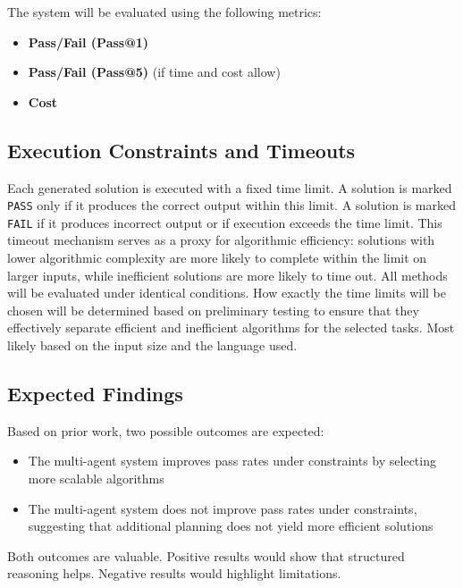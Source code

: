 \documentclass{article}
\begin{document}
The system will be evaluated using the following metrics:

\begin{itemize}[noitemsep]
    \item \textbf{Pass/Fail (Pass@1)}
    \item \textbf{Pass/Fail (Pass@5)} (if time and cost allow)
    \item \textbf{Cost}
\end{itemize}

\subsection*{Execution Constraints and Timeouts}

Each generated solution is executed with a fixed time limit. A solution is marked \texttt{PASS} only if it produces the correct output within this limit. A solution is marked \texttt{FAIL} if it produces incorrect output or if execution exceeds the time limit. This timeout mechanism serves as a proxy for algorithmic efficiency: solutions with lower algorithmic complexity are more likely to complete within the limit on larger inputs, while inefficient solutions are more likely to time out. All methods will be evaluated under identical conditions.
How exactly the time limits will be chosen will be determined based on preliminary testing to ensure that they effectively separate efficient and inefficient algorithms for the selected tasks. Most likely based on the input size and the language used.

\subsection*{Expected Findings}

Based on prior work, two possible outcomes are expected:

\begin{itemize}[noitemsep]
    \item The multi-agent system improves pass rates under constraints by selecting more scalable algorithms
    \item The multi-agent system does not improve pass rates under constraints, suggesting that additional planning does not yield more efficient solutions
\end{itemize}

Both outcomes are valuable. Positive results would show that structured reasoning helps. Negative results would highlight limitations.
\end{document}
